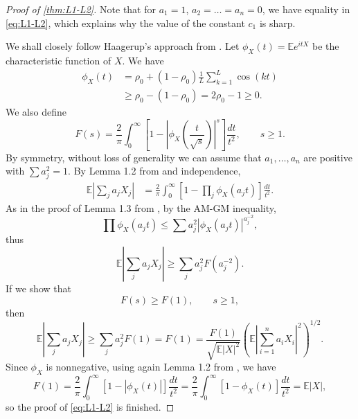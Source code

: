 \documentclass[10pt]{article}
\newcommand{\E}{\mathbb{E}}
\newcommand{\1}{\textbf{1}}
\theoremstyle{remark}
\theoremstyle{definition}
\begin{document}
\begin{proof}[Proof of \ref{thm:L1-L2}]
Note that for $a_1 = 1$, $a_2 = \dots = a_n = 0$, we have equality in \eqref{eq:L1-L2}, which explains why the value of the constant $c_1$ is sharp.

We shall closely follow Haagerup's approach from \cite{H}. Let $\phi_X(t) = \E e^{itX}$ be the characteristic function of $X$. We have
\begin{align*}
\phi_X(t) &= \rho_0 + (1-\rho_0)\frac{1}{L}\sum_{k=1}^L \cos(kt) \\
&\geq \rho_0 -(1-\rho_0) = 2\rho_0 -1 \geq 0.
\end{align*}
We also define
\[
F(s) = \frac{2}{\pi}\int_0^\infty\left[1 - \left|\phi_X\left(\frac{t}{\sqrt{s}}\right)\right|^s\right]\frac{dt}{t^2}, \qquad s \geq 1.
\]
By symmetry, without loss of generality we can assume that $a_1, \ldots, a_n$ are positive with $\sum a_j^2 = 1$. By Lemma 1.2 from \cite{H} and independence,
\begin{align*}
\E\left|\sum_j a_j X_j\right| &= \frac{2}{\pi}\int_0^\infty \left[ 1 - \prod_j \phi_X(a_jt) \right] \frac{dt}{t^2}.
\end{align*}
As in the proof of Lemma 1.3 from \cite{H}, by the AM-GM inequality, 
\[
\prod \phi_X(a_jt) \leq \sum a_j^{2}|\phi_X(a_jt)|^{a_j^{-2}},
\]
thus
\[
\E\left|\sum_j a_j X_j\right| \geq \sum_j a_j^2F(a_j^{-2}).
\]
If we show that
\begin{equation}\label{eq:F>F(1)}
F(s) \geq F(1), \qquad s \geq 1,
\end{equation}
then
\[
\E\left|\sum_j a_j X_j\right| \geq \sum_j a_j^2F(1) = F(1) = \frac{F(1)}{\sqrt{\E |X|^2}}\left(\E\left|\sum_{i=1}^n a_iX_i \right|^2\right)^{1/2}.
\]
Since $\phi_X$ is nonnegative, using again Lemma 1.2 from \cite{H}, we have 
\[
F(1) = \frac{2}{\pi}\int_0^\infty\left[1 - \left|\phi_X\left(t\right)\right|\right]\frac{dt}{t^2} = \frac{2}{\pi}\int_0^\infty\left[1 - \phi_X\left(t\right)\right]\frac{dt}{t^2} = \E|X|,
\]
so the proof of \eqref{eq:L1-L2} is finished. 


\end{proof}
\end{document}
